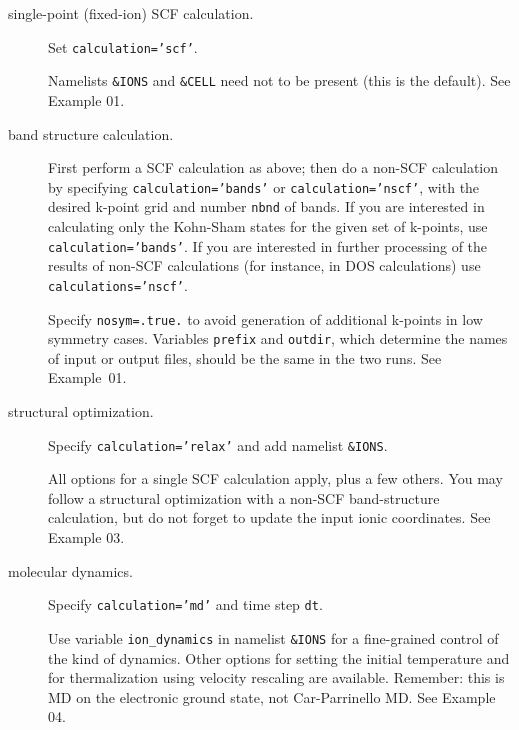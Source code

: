 \documentclass[12pt,a4paper]{article}
\begin{document}
\begin{description}

  \item [single-point (fixed-ion) SCF calculation.]

    Set \texttt{calculation='scf'}.

    Namelists \texttt{\&IONS} and \texttt{\&CELL} need not to be
    present (this is the default).  See Example 01.

  \item [band structure calculation.]

    First perform a SCF calculation as above; then do a non-SCF
    calculation by specifying \texttt{calculation='bands'} or
    \texttt{calculation='nscf'}, with the desired k-point grid 
    and number \texttt{nbnd} of bands.
    If you are interested in calculating only the Kohn-Sham states 
    for the given set of k-points, use \texttt{calculation='bands'}. 
    If you are interested in further processing of the results of
    non-SCF calculations (for instance, in DOS calculations) use
    \texttt{calculations='nscf'}.

    Specify \texttt{nosym=.true.} to avoid generation of additional
    k-points in low symmetry cases.  Variables \texttt{prefix} and
    \texttt{outdir}, which determine the names of input or output
    files, should be the same in the two runs.  See Example~01.

  \item [structural optimization.]
    
    Specify \texttt{calculation='relax'} and add namelist \texttt{\&IONS}.

    All options for a single SCF calculation apply, plus a few others.
    You may follow a structural optimization with a non-SCF
    band-structure calculation, but do not forget to update the input
    ionic coordinates.  See Example 03.

  \item [molecular dynamics.]

    Specify \texttt{calculation='md'} and time step \texttt{dt}.

    Use variable \texttt{ion\_dynamics} in namelist \texttt{\&IONS}
    for a fine-grained control of the kind of dynamics.  Other options
    for setting the initial temperature and for thermalization using
    velocity rescaling are available.  Remember: this is MD on the
    electronic ground state, not Car-Parrinello MD.  See Example 04.


\end{description}
\end{document}
